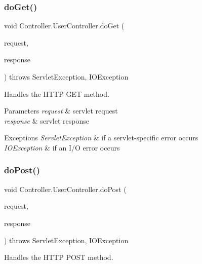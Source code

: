 \subsubsection{\texorpdfstring{doGet()}{doGet()}}
{\footnotesize\ttfamily void Controller.\+User\+Controller.\+do\+Get (\begin{DoxyParamCaption}\item[{Http\+Servlet\+Request}]{request,  }\item[{Http\+Servlet\+Response}]{response }\end{DoxyParamCaption}) throws Servlet\+Exception, I\+O\+Exception\hspace{0.3cm}{\ttfamily [protected]}}

Handles the H\+T\+TP {\ttfamily G\+ET} method.


\begin{DoxyParams}{Parameters}
{\em request} & servlet request \\
\hline
{\em response} & servlet response \\
\hline
\end{DoxyParams}

\begin{DoxyExceptions}{Exceptions}
{\em Servlet\+Exception} & if a servlet-\/specific error occurs \\
\hline
{\em I\+O\+Exception} & if an I/O error occurs \\
\hline
\end{DoxyExceptions}
\mbox{\label{class_controller_1_1_user_controller_a74a8b03f608cf52dded94ff373bc7d10}} 
\subsubsection{\texorpdfstring{doPost()}{doPost()}}
{\footnotesize\ttfamily void Controller.\+User\+Controller.\+do\+Post (\begin{DoxyParamCaption}\item[{Http\+Servlet\+Request}]{request,  }\item[{Http\+Servlet\+Response}]{response }\end{DoxyParamCaption}) throws Servlet\+Exception, I\+O\+Exception\hspace{0.3cm}{\ttfamily [protected]}}

Handles the H\+T\+TP {\ttfamily P\+O\+ST} method.


